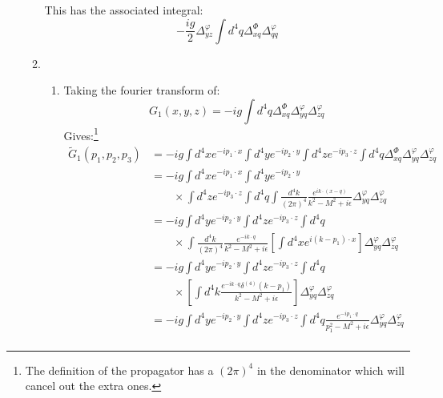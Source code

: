 \documentclass[12pt,a4]{article}
\begin{document}
\begin{enumerate}
\begin{enumerate}
        This has the associated integral:
        \begin{equation*}
          -\frac{ig}{2}\Delta^{\varphi}_{yz}\int d^4 q\Delta^{\Phi}_{xq} \Delta^{\varphi}_{qq}
        \end{equation*}
      \item
        \begin{enumerate}
          \item
            Taking the fourier transform of:
            \begin{equation*}
              G_1(x, y, z) = -ig\int d^4 q\Delta^{\Phi}_{xq} \Delta^{\varphi}_{yq}\Delta^{\varphi}_{zq}
            \end{equation*}
            Gives:\footnote{The definition of the propagator has a $(2\pi)^4$ in the denominator which will cancel out the extra ones.}
            \begin{align*}
              \tilde G_1(p_1, p_2, p_3) &= -ig\int d^4x e^{-i p_1\cdot x}\int d^4y e^{-i p_2\cdot y}\int d^4z e^{-i p_3\cdot z}\int d^4 q\Delta^{\Phi}_{xq} \Delta^{\varphi}_{yq}\Delta^{\varphi}_{zq}\\
                                        &= -ig\int d^4x e^{-i p_1 \cdot x}\int d^4y e^{-i p_2\cdot y}\\
                                        & \qquad \times \int d^4z e^{-i p_3\cdot z}\int d^4 q\int \frac{d^4 k}{(2 \pi)^4} \frac{e^{ik\cdot (x - q)}}{k^2 - M^2 + i \epsilon} \Delta^{\varphi}_{yq}\Delta^{\varphi}_{zq}\\
                                        &= -ig\int d^4y e^{-i p_2\cdot y}\int d^4z e^{-i p_3\cdot z}\int d^4 q\\
                                        & \qquad \times \int \frac{d^4 k}{(2 \pi)^4} \frac{e^{-ik\cdot  q}}{k^2 - M^2 + i \epsilon}\left[\int d^4x e^{i(k - p_1)\cdot x} \right]\Delta^{\varphi}_{yq}\Delta^{\varphi}_{zq}\\
                                        &= -ig\int d^4y e^{-i p_2\cdot y}\int d^4z e^{-i p_3\cdot z}\int d^4 q\\
                                        &\qquad \times \left[\int d^4 k \frac{e^{-ik\cdot  q}\delta^{(4)}(k - p_1)}{k^2 - M^2 + i \epsilon}\right] \Delta^{\varphi}_{yq}\Delta^{\varphi}_{zq}\\
                                        &= -ig\int d^4y e^{-i p_2\cdot y}\int d^4z e^{-i p_3\cdot z}\int d^4 q \frac{e^{-ip_1\cdot  q}}{p_1^2 - M^2 + i \epsilon} \Delta^{\varphi}_{yq}\Delta^{\varphi}_{zq}\\

\end{align*}
\end{enumerate}
\end{enumerate}
\end{enumerate}
\end{document}
